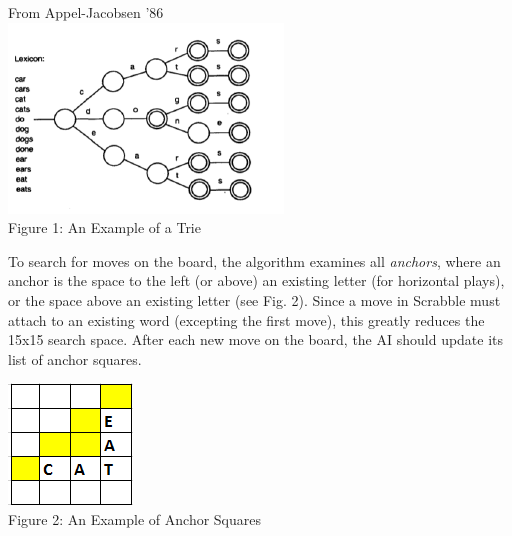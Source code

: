 \documentclass[12pt]{article}
\begin{document}
\begin{center}

From Appel-Jacobsen '86\\
\includegraphics[scale=0.6]{../images/trie}\\
Figure 1: An Example of a Trie \\
\end{center}

  
To search for moves on the board, the algorithm examines all
\emph{anchors}, where an anchor is the space to the left (or above) an
existing letter (for horizontal plays), or the space above an existing
letter (see Fig. 2). Since a move in Scrabble must attach to an
existing word (excepting the first move), this greatly reduces the
15x15 search space. After each new move on the board, the AI should
update its list of anchor squares.

\begin{center}
\includegraphics{../images/anchorexample}\\
Figure 2: An Example of Anchor Squares
\end{center}
\end{document}
